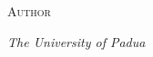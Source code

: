 \begin{titlepage}
	{\scshape\Large Author \\} %
	
	\vspace{0.5\baselineskip} %
	
	\textit{The University of Padua } %
	
	\vfill %
	
%	
%	
%	
%	

\end{titlepage}

\clearpage{\pagestyle{empty}\cleardoublepage}
